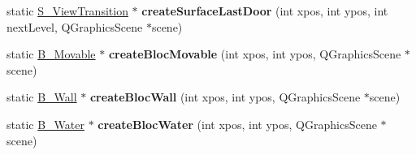 \begin{DoxyCompactItemize}
\item 
\hypertarget{class_surface_factory_a022f3ac1cb0b164a268fc8f11b5c2ccb}{}static \hyperlink{class_s___view_transition}{S\+\_\+\+View\+Transition} $\ast$ {\bfseries create\+Surface\+Last\+Door} (int xpos, int ypos, int next\+Level, Q\+Graphics\+Scene $\ast$scene)\label{class_surface_factory_a022f3ac1cb0b164a268fc8f11b5c2ccb}

\item 
\hypertarget{class_surface_factory_a03df45d6d97115bc99fd5bfb4f9c3464}{}static \hyperlink{class_b___movable}{B\+\_\+\+Movable} $\ast$ {\bfseries create\+Bloc\+Movable} (int xpos, int ypos, Q\+Graphics\+Scene $\ast$scene)\label{class_surface_factory_a03df45d6d97115bc99fd5bfb4f9c3464}

\item 
\hypertarget{class_surface_factory_a326154617732ae9d5a4fa354b14f7e4e}{}static \hyperlink{class_b___wall}{B\+\_\+\+Wall} $\ast$ {\bfseries create\+Bloc\+Wall} (int xpos, int ypos, Q\+Graphics\+Scene $\ast$scene)\label{class_surface_factory_a326154617732ae9d5a4fa354b14f7e4e}

\item 
\hypertarget{class_surface_factory_a5c24892583feb23b8ce2f2aa49c3b041}{}static \hyperlink{class_b___water}{B\+\_\+\+Water} $\ast$ {\bfseries create\+Bloc\+Water} (int xpos, int ypos, Q\+Graphics\+Scene $\ast$scene)\label{class_surface_factory_a5c24892583feb23b8ce2f2aa49c3b041}

\end{DoxyCompactItemize}
